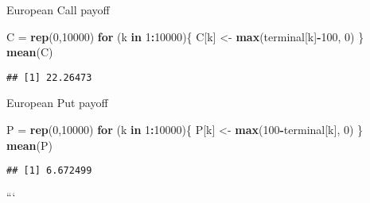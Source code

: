 \documentclass[
]{article}
\newenvironment{Shaded}{\begin{snugshade}}{\end{snugshade}}
\newcommand{\ControlFlowTok}[1]{\textcolor[rgb]{0.13,0.29,0.53}{\textbf{#1}}}
\newcommand{\DecValTok}[1]{\textcolor[rgb]{0.00,0.00,0.81}{#1}}
\newcommand{\KeywordTok}[1]{\textcolor[rgb]{0.13,0.29,0.53}{\textbf{#1}}}
\newcommand{\NormalTok}[1]{#1}
\newcommand{\OperatorTok}[1]{\textcolor[rgb]{0.81,0.36,0.00}{\textbf{#1}}}
\newcommand{\StringTok}[1]{\textcolor[rgb]{0.31,0.60,0.02}{#1}}
\begin{document}
European Call payoff

\begin{Shaded}
\begin{Highlighting}[]
\NormalTok{C =}\StringTok{ }\KeywordTok{rep}\NormalTok{(}\DecValTok{0}\NormalTok{,}\DecValTok{10000}\NormalTok{)}
\ControlFlowTok{for}\NormalTok{ (k }\ControlFlowTok{in} \DecValTok{1}\OperatorTok{:}\DecValTok{10000}\NormalTok{)\{}
\NormalTok{  C[k] <-}\StringTok{ }\KeywordTok{max}\NormalTok{(terminal[k]}\OperatorTok{-}\DecValTok{100}\NormalTok{, }\DecValTok{0}\NormalTok{)}
\NormalTok{\}}
\KeywordTok{mean}\NormalTok{(C)}
\end{Highlighting}
\end{Shaded}

\begin{verbatim}
## [1] 22.26473
\end{verbatim}

European Put payoff

\begin{Shaded}
\begin{Highlighting}[]
\NormalTok{P =}\StringTok{ }\KeywordTok{rep}\NormalTok{(}\DecValTok{0}\NormalTok{,}\DecValTok{10000}\NormalTok{)}
\ControlFlowTok{for}\NormalTok{ (k }\ControlFlowTok{in} \DecValTok{1}\OperatorTok{:}\DecValTok{10000}\NormalTok{)\{}
\NormalTok{  P[k] <-}\StringTok{ }\KeywordTok{max}\NormalTok{(}\DecValTok{100}\OperatorTok{-}\NormalTok{terminal[k], }\DecValTok{0}\NormalTok{)}
\NormalTok{\}}
\KeywordTok{mean}\NormalTok{(P)}
\end{Highlighting}
\end{Shaded}

\begin{verbatim}
## [1] 6.672499
\end{verbatim}

```
\end{document}

